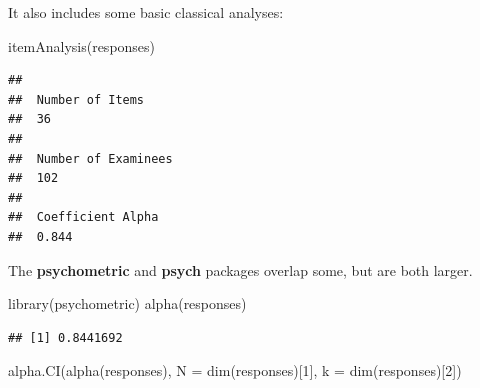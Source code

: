 \documentclass[
]{book}
\newenvironment{Shaded}{\begin{snugshade}}{\end{snugshade}}
\newcommand{\AttributeTok}[1]{\textcolor[rgb]{0.77,0.63,0.00}{#1}}
\newcommand{\CommentTok}[1]{\textcolor[rgb]{0.56,0.35,0.01}{\textit{#1}}}
\newcommand{\ConstantTok}[1]{\textcolor[rgb]{0.00,0.00,0.00}{#1}}
\newcommand{\DecValTok}[1]{\textcolor[rgb]{0.00,0.00,0.81}{#1}}
\newcommand{\FunctionTok}[1]{\textcolor[rgb]{0.00,0.00,0.00}{#1}}
\newcommand{\NormalTok}[1]{#1}
\newcommand{\OtherTok}[1]{\textcolor[rgb]{0.56,0.35,0.01}{#1}}
\newcommand{\SpecialCharTok}[1]{\textcolor[rgb]{0.00,0.00,0.00}{#1}}
\begin{document}
\begin{Shaded}
\end{Shaded}

It also includes some basic classical analyses:

\begin{Shaded}
\begin{Highlighting}[]
\FunctionTok{itemAnalysis}\NormalTok{(responses)}
\end{Highlighting}
\end{Shaded}

\begin{verbatim}
## 
##  Number of Items 
##  36 
## 
##  Number of Examinees 
##  102 
## 
##  Coefficient Alpha 
##  0.844
\end{verbatim}

The \textbf{psychometric} and \textbf{psych} packages overlap some, but are both larger.

\begin{Shaded}
\begin{Highlighting}[]
\FunctionTok{library}\NormalTok{(psychometric)}
\FunctionTok{alpha}\NormalTok{(responses)}
\end{Highlighting}
\end{Shaded}

\begin{verbatim}
## [1] 0.8441692
\end{verbatim}

\begin{Shaded}
\begin{Highlighting}[]
\FunctionTok{alpha.CI}\NormalTok{(}\FunctionTok{alpha}\NormalTok{(responses), }\AttributeTok{N =} \FunctionTok{dim}\NormalTok{(responses)[}\DecValTok{1}\NormalTok{], }\AttributeTok{k =} \FunctionTok{dim}\NormalTok{(responses)[}\DecValTok{2}\NormalTok{])}
\end{Highlighting}
\end{Shaded}
\end{document}
